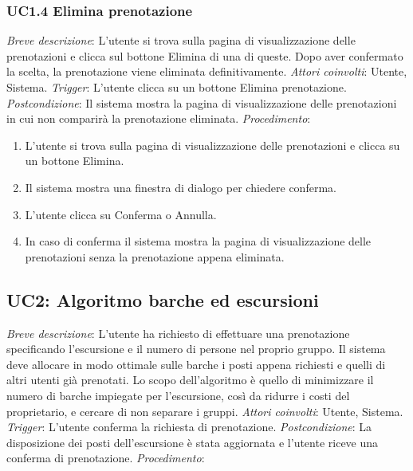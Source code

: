 \subsubsection{UC1.4 Elimina prenotazione}
\noindent \emph{Breve descrizione}: L'utente si trova sulla pagina di visualizzazione delle prenotazioni e clicca sul bottone Elimina di una di queste. Dopo aver confermato la scelta, la prenotazione viene eliminata definitivamente.\medbreak
\noindent \emph{Attori coinvolti}: Utente, Sistema.\medbreak
\noindent \emph{Trigger}: L'utente clicca su un bottone Elimina prenotazione.\medbreak
\noindent \emph{Postcondizione}: Il sistema mostra la pagina di visualizzazione delle prenotazioni in cui non comparirà la prenotazione eliminata.\medbreak
\noindent \emph{Procedimento}:

\begin{enumerate}
    \item L'utente si trova sulla pagina di visualizzazione delle prenotazioni e clicca su un bottone Elimina.
    \item Il sistema mostra una finestra di dialogo per chiedere conferma.
    \item L'utente clicca su Conferma o Annulla.
    \item In caso di conferma il sistema mostra la pagina di visualizzazione delle prenotazioni senza la prenotazione appena eliminata.
\end{enumerate}

\subsection{UC2: Algoritmo barche ed escursioni}
\noindent \emph{Breve descrizione}: L'utente ha richiesto di effettuare una prenotazione specificando l'escursione e il numero di persone nel proprio gruppo. Il sistema deve allocare in modo ottimale sulle barche i posti appena richiesti e quelli di altri utenti già prenotati. Lo scopo dell'algoritmo è quello di minimizzare il numero di barche impiegate per l'escursione, così da ridurre i costi del proprietario, e cercare di non separare i gruppi.\medbreak
\noindent \emph{Attori coinvolti}: Utente, Sistema.\medbreak
\noindent \emph{Trigger}: L'utente conferma la richiesta di prenotazione.\medbreak
\noindent \emph{Postcondizione}: La disposizione dei posti dell'escursione è stata aggiornata e l'utente riceve una conferma di prenotazione.\medbreak
\noindent \emph{Procedimento}:

